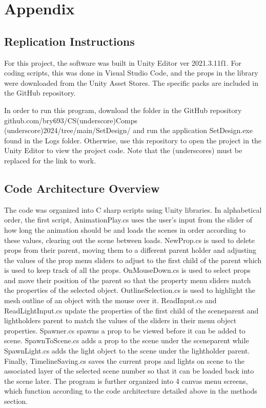 \documentclass[10pt,twocolumn]{article}
\begin{document}
\section{Appendix}
\subsection{Replication Instructions}
For this project, the software was built in Unity Editor ver 2021.3.11f1. For coding scripts, this was done in Visual Studio Code, and the props in the library were downloaded from the Unity Asset Stores. The specific packs are included in the GitHub repository. 

In order to run this program, download the folder in the GitHub repository 
github.com/bry693/CS(underscore)Comps
(underscore)2024/tree/main/SetDesign/ 
and run the application SetDesign.exe found in the Logs folder. Otherwise, use this repository to open the project in the Unity Editor to view the project code. Note that the (underscores) must be replaced for the link to work. 

\subsection{Code Architecture Overview}
The code was organized into C sharp scripts using Unity libraries. In alphabetical order, the first script, AnimationPlay.cs uses the user's input from the slider of how long the animation should be and loads the scenes in order according to these values, clearing out the scene between loads. NewProp.cs is used to delete props from their parent, moving them to a different parent holder and adjusting the values of the prop menu sliders to adjust to the first child of the parent which is used to keep track of all the props. OnMouseDown.cs is used to select props and move their position of the parent so that the property menu sliders match the properties of the selected object. OutlineSelection.cs is used to highlight the mesh outline of an object with the mouse over it. ReadInput.cs and ReadLightInput.cs update the properties of the first child of the sceneparent and lightholders parent to match the values of the sliders in their menu object properties. Spawner.cs spawns a prop to be viewed before it can be added to scene. SpawnToScene.cs adds a prop to the scene under the sceneparent while SpawnLight.cs adds the light object to the scene under the lightholder parent. Finally, TimelineSaving.cs saves the current props and lights on scene to the associated layer of the selected scene number so that it can be loaded back into the scene later. The program is further organized into 4 canvas menu screens, which function according to the code architecture detailed above in the methods section. 
\end{document}
